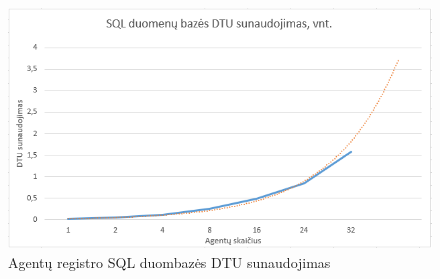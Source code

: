 \begin{figure}[h]
\hspace{-1cm}
\centering
\includegraphics[scale=1]{img/sql_dtu_sunaudojimas.png}
\caption{Agentų registro SQL duombazės DTU sunaudojimas}
\label{fig:dtu_usage}
\end{figure}